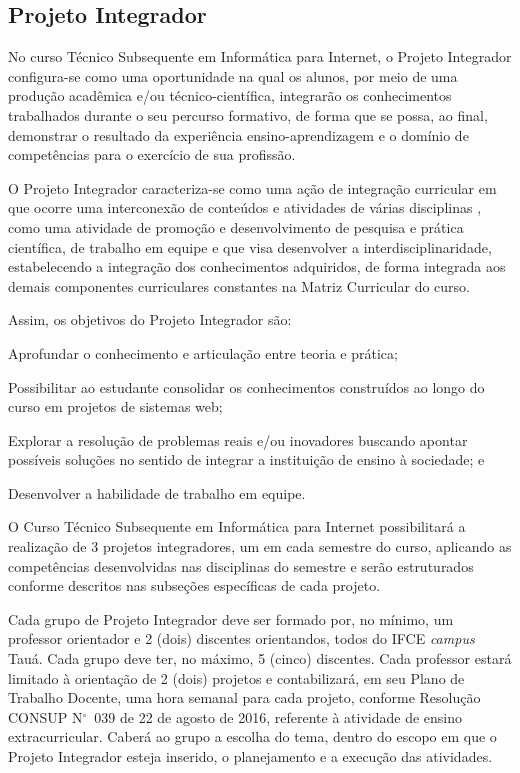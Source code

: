 \documentclass[
	12pt,				%
	openright,			%
	twoside,			%
	a4paper,			%
	chapter=TITLE,		%
	english,			%
	french,				%
	spanish,			%
	brazil,				%
	]{abntex2}
\newcommand{\n}{N$^\circ$}
\begin{document}
\subsection{Projeto Integrador}


No curso Técnico Subsequente em Informática para Internet, o Projeto Integrador configura-se como uma oportunidade na qual os alunos, por meio de uma produção acadêmica e/ou técnico-científica, integrarão os conhecimentos trabalhados durante o seu percurso formativo, de forma que se possa, ao final, demonstrar o resultado da experiência ensino-aprendizagem e o domínio de competências para o exercício de sua profissão.

O Projeto Integrador caracteriza-se como uma ação de integração curricular em que ocorre uma interconexão de conteúdos e atividades de várias disciplinas \cite{pj}, como uma atividade de promoção e desenvolvimento de pesquisa e prática científica, de trabalho em equipe e que visa desenvolver a interdisciplinaridade, estabelecendo a integração dos conhecimentos adquiridos, de forma integrada aos demais componentes curriculares constantes na Matriz Curricular do curso.


Assim, os objetivos do Projeto Integrador são:
\begin{alineas}
\item Aprofundar o conhecimento e articulação entre teoria e prática;
\item  Possibilitar ao estudante consolidar os conhecimentos construídos ao longo
do curso em projetos de sistemas web;
\item  Explorar a resolução de problemas reais e/ou inovadores buscando apontar possíveis soluções no sentido de integrar a instituição de ensino à sociedade; e
\item Desenvolver a habilidade de trabalho em equipe.

\end{alineas}

O Curso Técnico Subsequente em Informática para Internet possibilitará a realização de 3 projetos integradores,  um em cada semestre do curso, aplicando as competências desenvolvidas nas disciplinas do semestre e serão estruturados conforme  descritos  nas subseções específicas de cada projeto.


Cada grupo de Projeto Integrador deve ser formado por, no mínimo, um professor orientador e 2 (dois) discentes orientandos, todos do IFCE \textit{campus} Tauá. Cada grupo deve ter, no máximo, 5 (cinco) discentes. Cada professor estará limitado à orientação de 2 (dois) projetos e contabilizará, em seu Plano de Trabalho Docente, uma hora semanal para cada projeto, conforme Resolução CONSUP \n~039 de 22 de agosto de 2016, referente à atividade de ensino extracurricular. Caberá ao grupo a escolha do tema, dentro do escopo em que o Projeto Integrador esteja inserido, o planejamento e a execução das atividades.
\end{document}
